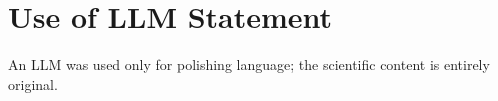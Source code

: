\appendix


\section{Use of LLM Statement}
\label{app:llm-usage}

An LLM was used only for polishing language; the scientific content is entirely original.



